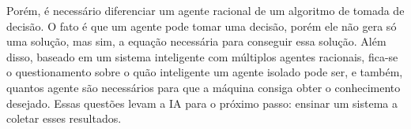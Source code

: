 Porém, é necessário diferenciar um agente racional de um algoritmo de tomada de decisão. O fato é que um agente pode tomar uma decisão, porém ele não gera só uma solução, mas sim, a equação necessária para conseguir essa solução. Além disso, baseado em um sistema inteligente com múltiplos agentes racionais, fica-se o questionamento sobre o quão inteligente um agente isolado pode ser, e também, quantos agente são necessários para que a máquina consiga obter o conhecimento desejado. Essas questões levam a IA para o próximo passo: ensinar um sistema a coletar esses resultados.
